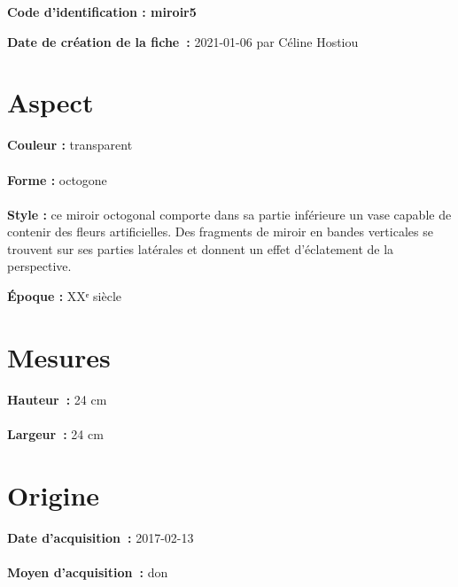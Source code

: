 
     {\bf \huge Code d’identification : miroir5} \\
    \newline \hr \begin{center}   
    \end{center} 
    \begin{itemize}
    
    \footnotesize {\item {\bf Date de création de la fiche :} 2021-01-06
    {par Céline Hostiou}} 
    \end{itemize}
   \hr 
    \section* {Aspect} 
    {\bf \large Couleur :} transparent
    \\ \\ {\bf \large Forme :} octogone 
    \\ \\ {\bf \large Style :} 
            ce miroir octogonal comporte dans sa partie inférieure un vase
            capable de contenir des fleurs artificielles. Des fragments de miroir en bandes
            verticales se trouvent sur ses parties latérales et donnent un effet d’éclatement de la
            perspective.
         
        {\bf \large Époque :} XXᵉ siècle 
    \section* {Mesures}
     {\bf \large Hauteur :} 24 cm
   \\ \\ {\bf \large Largeur :} 24 cm 
  
    \section* {Origine}
    {\bf \large Date d’acquisition :} 2017-02-13 \\ \\
    {\bf \large Moyen d’acquisition :} don  
  